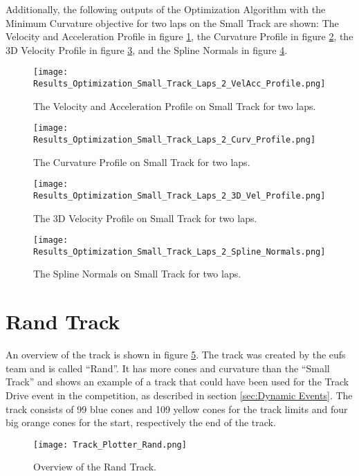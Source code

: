 Additionally, the following outputs of the Optimization Algorithm with the Minimum Curvature objective for two laps on the Small Track are shown: The Velocity and Acceleration Profile in figure \ref{fig:Results Small Track Laps 2 VelAcc Profile}, the Curvature Profile in figure \ref{fig:Results Small Track Laps 2 Curv Profile}, the 3D Velocity Profile in figure \ref{fig:Results Small Track Laps 2 3D Vel Profile}, and the Spline Normals in figure \ref{fig:Results Small Track Laps 2 Spline Normals}.
\begin{figure}[H]
    \centering
    \texttt{[image: Results\_Optimization\_Small\_Track\_Laps\_2\_VelAcc\_Profile.png]}
    \caption{The Velocity and Acceleration Profile on Small Track for two laps.}
    \label{fig:Results Small Track Laps 2 VelAcc Profile}
\end{figure}
\begin{figure}[H]
    \centering
    \texttt{[image: Results\_Optimization\_Small\_Track\_Laps\_2\_Curv\_Profile.png]}
    \caption{The Curvature Profile on Small Track for two laps.}
    \label{fig:Results Small Track Laps 2 Curv Profile}
\end{figure}
\begin{figure}[H]
    \centering
    \texttt{[image: Results\_Optimization\_Small\_Track\_Laps\_2\_3D\_Vel\_Profile.png]}
    \caption{The 3D Velocity Profile on Small Track for two laps.}
    \label{fig:Results Small Track Laps 2 3D Vel Profile}
\end{figure}
\begin{figure}[H]
    \centering
    \texttt{[image: Results\_Optimization\_Small\_Track\_Laps\_2\_Spline\_Normals.png]}
    \caption{The Spline Normals on Small Track for two laps.}
    \label{fig:Results Small Track Laps 2 Spline Normals}
\end{figure}

\pagebreak

\section{Rand Track} \label{sec:Results Rand Track}
An overview of the track is shown in figure \ref{fig:Results Rand Initial}. The track was created by the \acrshort{eufs} team and is called ``Rand''. \cite{eufs_sim_gitlab} It has more cones and curvature than the ``Small Track'' and shows an example of a track that could have been used for the Track Drive event in the competition, as described in section \ref{sec:Dynamic Events}. The track consists of 99 blue cones and 109 yellow cones for the track limits and four big orange cones for the start, respectively the end of the track.
\begin{figure}[H]
    \centering
    \texttt{[image: Track\_Plotter\_Rand.png]}
    \caption{Overview of the Rand Track.}
    \label{fig:Results Rand Initial}
\end{figure}

